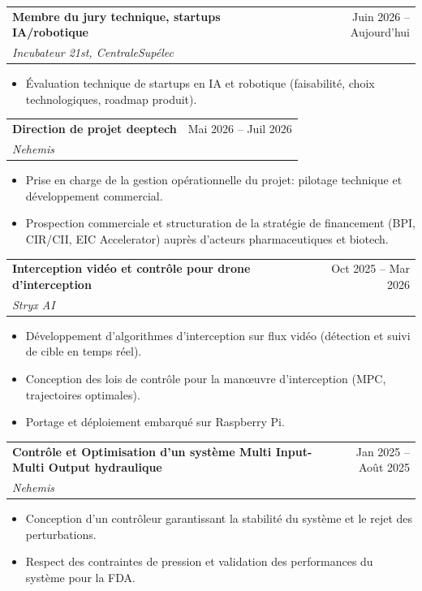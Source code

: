 \documentclass[letterpaper,11pt]{article}
\makeatletter
\newcommand{\resumeItem}[1]{
  \item\small{
    {#1 \vspace{-7pt}}
  }
}
\newcommand{\resumeSubheading}[4]{
  \vspace{-3pt}\item
    \begin{tabular*}{0.97\textwidth}[t]{l@{\extracolsep{\fill}}r}
      \textbf{#1} & #2 \\
      \textit{\small#3} & \textit{\small #4} \\
    \end{tabular*}\vspace{-7pt}
}
\newcommand{\resumeItemListStart}{\begin{itemize}}
\newcommand{\resumeItemListEnd}{\end{itemize}\vspace{-3pt}}
\makeatother
\begin{document}
\resumeSubheading
  {Membre du jury technique, startups IA/robotique}{Juin 2026 -- Aujourd'hui}{Incubateur 21st, CentraleSupélec}{}

  \resumeItemListStart
    \resumeItem{Évaluation technique de startups en IA et robotique (faisabilité, choix technologiques, roadmap produit).}
  \resumeItemListEnd
  \vspace{6pt}

\resumeSubheading
  {Direction de projet deeptech}{Mai 2026 -- Juil 2026}{Nehemis}{}

  \resumeItemListStart
    \resumeItem{Prise en charge de la gestion opérationnelle du projet: pilotage technique et développement commercial.}
\vspace{4pt}
\resumeItem{Prospection commerciale et structuration de la stratégie de financement (BPI, CIR/CII, EIC Accelerator) auprès d'acteurs pharmaceutiques et biotech.}
  \resumeItemListEnd
  \vspace{6pt}
\resumeSubheading
  {Interception vidéo et contrôle pour drone d'interception}{Oct 2025 -- Mar 2026}{Stryx AI}{}

  \resumeItemListStart
    \resumeItem{Développement d'algorithmes d'interception sur flux vidéo (détection et suivi de cible en temps réel).}
    \vspace{4pt}
    \resumeItem{Conception des lois de contrôle pour la manœuvre d'interception (MPC, trajectoires optimales).}
    \vspace{4pt}
    \resumeItem{Portage et déploiement embarqué sur Raspberry Pi.}
  \resumeItemListEnd
  \vspace{6pt}


\resumeSubheading
  {Contrôle et Optimisation d'un système Multi Input-Multi Output hydraulique}{Jan 2025 -- Août 2025}{Nehemis}{}

  \resumeItemListStart
    \resumeItem{Conception d'un contrôleur garantissant la stabilité du système et le rejet des perturbations.}
    \vspace{4pt}
    \resumeItem{Respect des contraintes de pression et validation des performances du système pour la FDA.}
  \resumeItemListEnd
  \vspace{6pt}
\end{document}
